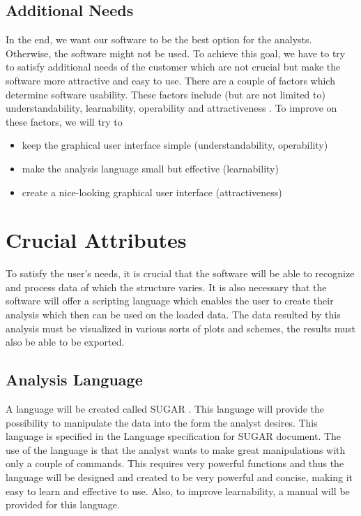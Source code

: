 \documentclass[a4paper]{article}
\begin{document}
\subsection{Additional Needs}
In the end, we want our software to be the best option for the analysts. Otherwise, the software might not be used. To achieve this goal, we have to try to satisfy additional needs of the customer which are not crucial but make the software more attractive and easy to use. There are a couple of factors which determine software usability. These factors include (but are not limited to) understandability, learnability, operability and attractiveness \cite{komiyama}. To improve on these factors, we will try to 
\begin{itemize}
\item keep the graphical user interface simple (understandability, operability) 
\item make the analysis language small but effective (learnability)
\item create a nice-looking graphical user interface (attractiveness) 
\end{itemize}

\section{Crucial Attributes}
To satisfy the user's needs, it is crucial that the software will be able to recognize and process data of which the structure varies. It is also necessary that the software will offer a scripting language which enables the user to create their analysis which then can be used on the loaded data. The data resulted by this analysis must be visualized in various sorts of plots and  schemes, the results must also be able to be exported. 

\subsection{Analysis Language}
A language will be created called SUGAR \cite{sugar}. This language will provide the possibility to manipulate the data into the form the analyst desires. This language is specified in the Language specification for SUGAR document. The use of the language is that the analyst wants to make great manipulations with only a couple of commands. This requires very powerful functions and thus the language will be designed and created to be very powerful and concise, making it easy to learn and effective to use. Also, to improve learnability, a manual will be provided for this language.
\end{document}
